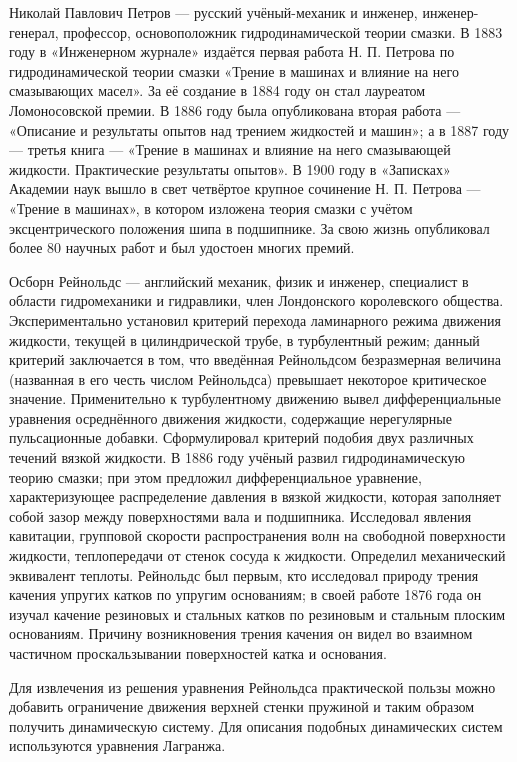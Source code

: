 \documentclass[a4paper,14pt]{extarticle}
\begin{document}
Николай Павлович Петров --- русский учёный-механик и инженер, инженер-генерал, профессор, основоположник гидродинамической теории смазки. В 1883 году в «Инженерном журнале» издаётся первая работа Н. П. Петрова по гидродинамической теории смазки «Трение в машинах и влияние на него смазывающих масел». За её создание в 1884 году он стал лауреатом Ломоносовской премии. В 1886 году была опубликована вторая работа — «Описание и результаты опытов над трением жидкостей и машин»; а в 1887 году — третья книга — «Трение в машинах и влияние на него смазывающей жидкости. Практические результаты опытов». В 1900 году в «Записках» Академии наук вышло в свет четвёртое крупное сочинение Н. П. Петрова — «Трение в машинах», в котором изложена теория смазки с учётом эксцентрического положения шипа в подшипнике. За свою жизнь опубликовал более 80 научных работ и был удостоен многих премий.

\newpage

Осборн Рейнольдс ---  английский механик, физик и инженер, специалист в области гидромеханики и гидравлики, член Лондонского королевского общества. Экспериментально установил критерий перехода ламинарного режима движения жидкости, текущей в цилиндрической трубе, в турбулентный режим; данный критерий заключается в том, что введённая Рейнольдсом безразмерная величина (названная в его честь числом Рейнольдса) превышает некоторое критическое значение. Применительно к турбулентному движению вывел дифференциальные уравнения осреднённого движения жидкости, содержащие нерегулярные пульсационные добавки. Сформулировал критерий подобия двух различных течений вязкой жидкости.
В 1886 году учёный развил гидродинамическую теорию смазки; при этом предложил дифференциальное уравнение, характеризующее распределение давления в вязкой жидкости, которая заполняет собой зазор между поверхностями вала и подшипника.
Исследовал явления кавитации, групповой скорости распространения волн на свободной поверхности жидкости, теплопередачи от стенок сосуда к жидкости. Определил механический эквивалент теплоты.
Рейнольдс был первым, кто исследовал природу трения качения упругих катков по упругим основаниям; в своей работе 1876 года он изучал качение резиновых и стальных катков по резиновым и стальным плоским основаниям. Причину возникновения трения качения он видел во взаимном частичном проскальзывании поверхностей катка и основания.

Для извлечения из решения уравнения Рейнольдса практической пользы можно добавить ограничение движения верхней стенки пружиной и таким образом получить динамическую систему. Для описания подобных динамических систем используются уравнения Лагранжа.
\end{document}
